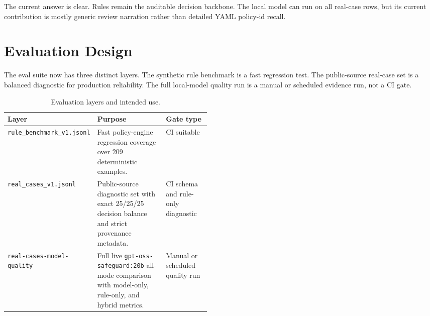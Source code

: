 \documentclass[10pt]{article}
\newcommand{\dataset}{\texttt{real\_cases\_v1.jsonl}}
\newcommand{\modelname}{\texttt{gpt-oss-safeguard:20b}}
\begin{document}
The current answer is clear. Rules remain the auditable decision backbone. The
local model can run on all real-case rows, but its current contribution is
mostly generic review narration rather than detailed YAML policy-id recall.

\section{Evaluation Design}

The eval suite now has three distinct layers. The synthetic rule benchmark is a
fast regression test. The public-source real-case set is a balanced diagnostic
for production reliability. The full local-model quality run is a manual or
scheduled evidence run, not a CI gate.

\begin{table}[!htbp]
\centering
\caption{Evaluation layers and intended use.}
\label{tab:eval-layers}
\small
\begin{tabularx}{\linewidth}{@{}P{0.25\linewidth}L P{0.22\linewidth}@{}}
\toprule
\textbf{Layer} & \textbf{Purpose} & \textbf{Gate type} \\
\midrule
\texttt{rule\_benchmark\_v1.jsonl} & Fast policy-engine regression coverage over 209 deterministic examples. & CI suitable \\
\dataset{} & Public-source diagnostic set with exact 25/25/25 decision balance and strict provenance metadata. & CI schema and rule-only diagnostic \\
\texttt{real-cases-model-quality} & Full live \modelname{} all-mode comparison with model-only, rule-only, and hybrid metrics. & Manual or scheduled quality run \\
\bottomrule
\end{tabularx}
\end{table}
\end{document}

